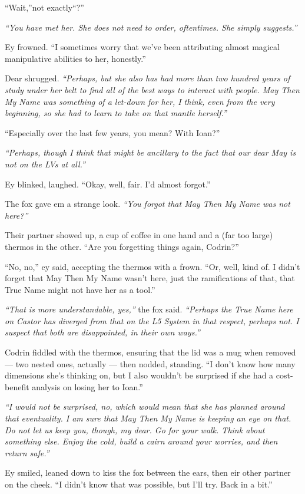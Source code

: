 ``Wait,''not exactly``?''

\emph{``You have met her. She does not need to order, oftentimes. She simply suggests.''}

Ey frowned. ``I sometimes worry that we've been attributing almost magical manipulative abilities to her, honestly.''

Dear shrugged. \emph{``Perhaps, but she also has had more than two hundred years of study under her belt to find all of the best ways to interact with people. May Then My Name was something of a let-down for her, I think, even from the very beginning, so she had to learn to take on that mantle herself.''}

``Especially over the last few years, you mean? With Ioan?''

\emph{``Perhaps, though I think that might be ancillary to the fact that our dear May is not on the LVs at all.''}

Ey blinked, laughed. ``Okay, well, fair. I'd almost forgot.''

The fox gave em a strange look. \emph{``You forgot that May Then My Name was not here?''}

Their partner showed up, a cup of coffee in one hand and a (far too large) thermos in the other. ``Are you forgetting things again, Codrin?''

``No, no,'' ey said, accepting the thermos with a frown. ``Or, well, kind of. I didn't forget that May Then My Name wasn't here, just the ramifications of that, that True Name might not have her as a tool.''

\emph{``That is more understandable, yes,''} the fox said. \emph{``Perhaps the True Name here on Castor has diverged from that on the L5 System in that respect, perhaps not. I suspect that both are disappointed, in their own ways.''}

Codrin fiddled with the thermos, ensuring that the lid was a mug when removed — two nested ones, actually — then nodded, standing. ``I don't know how many dimensions she's thinking on, but I also wouldn't be surprised if she had a cost-benefit analysis on losing her to Ioan.''

\emph{``I would not be surprised, no, which would mean that she has planned around that eventuality. I am sure that May Then My Name is keeping an eye on that. Do not let us keep you, though, my dear. Go for your walk. Think about something else. Enjoy the cold, build a cairn around your worries, and then return safe.''}

Ey smiled, leaned down to kiss the fox between the ears, then eir other partner on the cheek. ``I didn't know that was possible, but I'll try. Back in a bit.''

